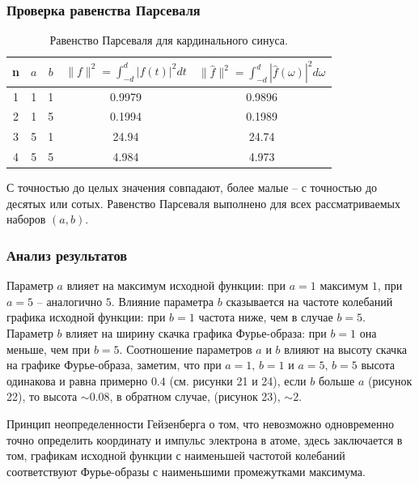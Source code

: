 \documentclass[a5paper, 10pt]{article}
\theoremstyle{definition}
\theoremstyle{plain}
\theoremstyle{remark}
\begin{document}
\subsubsection{Проверка равенства Парсеваля}

\begin{table}[h!]
\caption{Равенство Парсеваля для кардинального синуса.}
\label{tabular:timesandtenses}
\begin{center}
\begin{tabular}{|c|c|c|c|c|}
\hline
n & $a$ & $b$ & $\| f \|^2 = \int_{-d}^d |f(t)|^2 dt $ & $\| \hat{f} \|^2 = \int_{-d}^d |\hat{f}(\omega)|^2 d\omega $ \\
\hline
1 & 1 & 1 &  0.9979& 0.9896\\
\hline
2 & 1 & 5 & 0.1994 &0.1989 \\
\hline
3 & 5 & 1 & 24.94 & 24.74 \\
\hline
4 & 5 & 5 & 4.984 & 4.973 \\
\hline
\end{tabular}
\end{center}
\end{table}

С точностью до целых значения совпадают, более малые -- с точностью до десятых или сотых. Равенство Парсеваля выполнено для всех рассматриваемых наборов $(a, b)$.

\newpage
\subsubsection{Анализ результатов}

Параметр $a$ влияет на максимум исходной функции: при $a=1$ максимум $1$, при $a=5$ -- аналогично $5$. Влияние параметра $b$ сказывается на частоте колебаний графика исходной функции: при $b=1$ частота ниже, чем в случае $b = 5$.\\

Параметр $b$ влияет на ширину скачка графика Фурье-образа: при $b=1$ она меньше, чем при $b=5$. Соотношение параметров $a$ и $b$ влияют на высоту скачка на графике Фурье-образа, заметим, что при $a=1, \, b=1$ и $a = 5, \, b = 5$ высота одинакова и равна примерно $0.4$ (см. рисунки 21 и 24), если $b$ больше $a$ (рисунок 22), то высота $\sim 0.08$, в обратном случае, (рисунок 23), $\sim 2$.

Принцип неопределенности Гейзенберга о том, что невозможно одновременно точно определить координату и импульс электрона в атоме, здесь заключается в том, графикам исходной функции с наименьшей частотой колебаний соответствуют Фурье-образы с наименьшими промежутками максимума.
\end{document}
